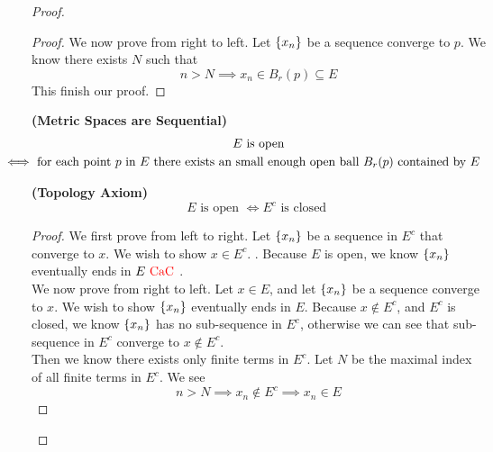 \documentclass{report}
\begin{document}
\begin{proof}
\begin{proof}
We now prove from right to left. Let $\{ x_n \}$ be a sequence converge to $p$. We know there exists $N$ such that
\begin{equation}
n>N\implies x_n\in B_r(p)\subseteq E
\end{equation}
This finish our proof.
\end{proof}
\begin{corollary}
\label{3.3.11}
\textbf{(Metric Spaces are Sequential)} 
\begin{gather}
\text{ $E$ is open  }\\
\liff \text{ for each point  $p$ in  $E$ there exists an small enough open ball $B_r(p)$ contained by $E$ }
\end{gather}
\end{corollary}
\begin{theorem}
\label{3.3.12}
\textbf{(Topology Axiom)}
\begin{equation}
E\text{ is open  }\iff E^c\text{ is closed }
\end{equation}
\end{theorem}
\begin{proof}
We first prove from left to right. Let $\{ x_n \}$ be a sequence in $E^c$ that converge to $x$. We wish to show  $x\in E^c$. . Because $E$ is open, we know $\{ x_n \}$ eventually ends in $E\text{ \textcolor{red}{CaC} }$.\\

We now prove from right to left. Let $x\in E$, and let $\{ x_n \}$ be a sequence converge to $x$. We wish to show  $\{ x_n \}$ eventually ends in $E$. Because  $x\not \in E^c$, and $E^c$ is closed, we know  $\{ x_n \}$ has no sub-sequence in  $E^c$, otherwise we can see that sub-sequence in $E^c$ converge to  $x\not\in E^c$.\\

Then we know there exists only finite terms in $E^c$. Let $N$ be the maximal index of all finite terms in  $E^c$. We see
 \begin{equation}
n>N\implies x_n\not\in E^c\implies x_n\in E
\end{equation}
\end{proof}

\end{proof}
\end{document}
